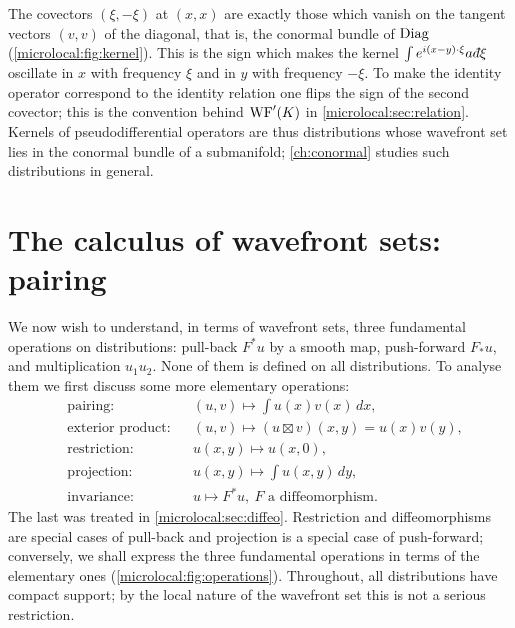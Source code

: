 \begin{discussion}
  The covectors $(\xi,-\xi)$ at $(x,x)$ are exactly those which vanish on the
  tangent vectors $(v,v)$ of the diagonal, that is, the conormal bundle of
  $\operatorname{Diag}$ (\cref{microlocal:fig:kernel}). This is the sign which makes the
  kernel $\int e^{i(x-y)\cdot\xi}a\,\dbar\xi$ oscillate in $x$ with frequency
  $\xi$ and in $y$ with frequency $-\xi$. To make the identity operator
  correspond to the identity relation one flips the sign of the second
  covector; this is the convention behind $\operatorname{WF}'(K)$ in
  \cref{microlocal:sec:relation}. Kernels of pseudodifferential operators are
  thus distributions whose wavefront set lies in the conormal bundle of a
  submanifold; \cref{ch:conormal} studies such distributions in general.
\end{discussion}

\section{The calculus of wavefront sets: pairing}\label{microlocal:sec:pairing}

We now wish to understand, in terms of wavefront sets, three fundamental
operations on distributions: pull-back $F^*u$ by a smooth map, push-forward
$F_*u$, and multiplication $u_1u_2$. None of them is defined on all
distributions. To analyse them we first discuss some more elementary
operations:
\begin{align*}
  &\text{pairing:}&&(u,v)\longmapsto\int u(x)v(x)\,dx,\\
  &\text{exterior product:}&&(u,v)\longmapsto(u\boxtimes v)(x,y)=u(x)v(y),\\
  &\text{restriction:}&&u(x,y)\longmapsto u(x,0),\\
  &\text{projection:}&&u(x,y)\longmapsto\int u(x,y)\,dy,\\
  &\text{invariance:}&&u\longmapsto F^*u,\ F\text{ a diffeomorphism}.
\end{align*}
The last was treated in \cref{microlocal:sec:diffeo}. Restriction and
diffeomorphisms are special cases of pull-back and projection is a special
case of push-forward; conversely, we shall express the three fundamental
operations in terms of the elementary ones (\cref{microlocal:fig:operations}).
Throughout, all distributions
have compact support; by the local nature of the wavefront set this is not
a serious restriction.

